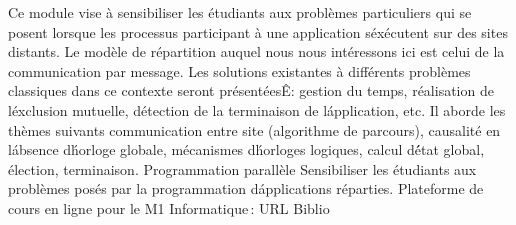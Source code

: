 {
Ce module vise à sensibiliser les étudiants aux problèmes particuliers qui se posent lorsque les processus participant à une application s\'exécutent sur des sites distants.
Le modèle de répartition auquel nous nous intéressons ici est celui de la communication par message.
Les solutions existantes à différents problèmes classiques dans ce contexte seront présentéesÊ:
gestion du temps, réalisation de l\'exclusion mutuelle, détection de la terminaison de l\'application, etc.
Il aborde les thèmes suivants communication entre site (algorithme de parcours), causalité en l\'absence d\'horloge globale, mécanismes d\'horloges logiques,
calcul d\'état global, élection, terminaison.
} 
{Programmation parallèle
} 
{Sensibiliser les étudiants aux problèmes posés par la programmation d\'applications réparties. 
} 
{Plateforme de cours en ligne pour le M1 Informatique\,: URL} 
{Biblio} 
 
\vfill

